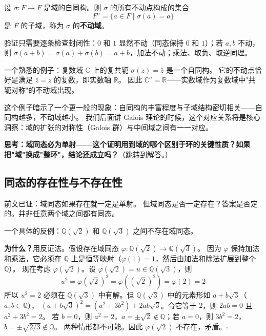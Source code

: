 \begin{proposition}[自同构的不动域]\label{prop:fixed-field}
设 $\sigma: F \to F$ 是域的自同构。则 $\sigma$ 的所有不动点构成的集合
\[
F^\sigma = \{a \in F \mid \sigma(a) = a\}
\]
是 $F$ 的子域，称为 $\sigma$ 的\textbf{不动域}。
\end{proposition}

验证只需要逐条检查封闭性：$0$ 和 $1$ 显然不动（同态保持 $0$ 和 $1$）；若 $a, b$ 不动，则 $\sigma(a+b) = \sigma(a)+\sigma(b) = a+b$，加法不动；乘法、取负、取逆同理。

一个熟悉的例子：复数域 $\mathbb{C}$ 上的复共轭 $\sigma(z) = \bar{z}$ 是一个自同构。
它的不动点恰好是满足 $\bar{z} = z$ 的复数，即实数轴 $\mathbb{R}$。
因此 $\mathbb{C}^\sigma = \mathbb{R}$——实数域作为复数域中"共轭对称"的不动域出现。

这个例子暗示了一个更一般的现象：自同构的丰富程度与子域结构密切相关——自同构越多，不动域越小。
我们后面讲 Galois 理论的时候，这个对应关系将是核心洞察：域的扩张的对称性（Galois 群）与中间域之间有一一对应。

\hypertarget{q:field-homomorphism-kernel}{}
\medskip
\noindent\textbf{思考：域同态必为单射——这个证明用到域的哪个区别于环的关键性质？如果把"域"换成"整环"，结论还成立吗？}（\hyperlink{ans:field-homomorphism-kernel}{跳转到解答}。）
\medskip

\subsection{同态的存在性与不存在性}

前文已证：域同态如果存在就一定是单射。
但域同态是否一定存在？答案是否定的。并非任意两个域之间都有同态。

一个具体的反例：$\mathbb{Q}(\sqrt{2})$ 和 $\mathbb{Q}(\sqrt{3})$ 之间不存在域同态。

\textbf{为什么？}用反证法。假设存在域同态 $\varphi: \mathbb{Q}(\sqrt{2}) \to \mathbb{Q}(\sqrt{3})$。
因为 $\varphi$ 保持加法和乘法，它必须在 $\mathbb{Q}$ 上是恒等映射（$\varphi(1)=1$，然后由加法和除法扩展到整个 $\mathbb{Q}$）。
现在考虑 $\varphi(\sqrt{2})$。设 $\varphi(\sqrt{2}) = u \in \mathbb{Q}(\sqrt{3})$，则
\[
u^2 = \varphi(\sqrt{2})^2 = \varphi((\sqrt{2})^2) = \varphi(2) = 2
\]
所以 $u^2 = 2$ 必须在 $\mathbb{Q}(\sqrt{3})$ 中有解。但 $\mathbb{Q}(\sqrt{3})$ 中的元素形如 $a + b\sqrt{3}$（$a, b \in \mathbb{Q}$），
$(a + b\sqrt{3})^2 = (a^2 + 3b^2) + 2ab\sqrt{3}$。令它等于 $2$，则 $2ab = 0$ 且 $a^2 + 3b^2 = 2$。
若 $b = 0$，则 $a^2 = 2$，$a = \pm\sqrt{2} \notin \mathbb{Q}$；若 $a = 0$，则 $3b^2 = 2$，$b = \pm\sqrt{2/3} \notin \mathbb{Q}$。
两种情形都不可能。因此 $\varphi(\sqrt{2})$ 不存在，矛盾。$\square$

